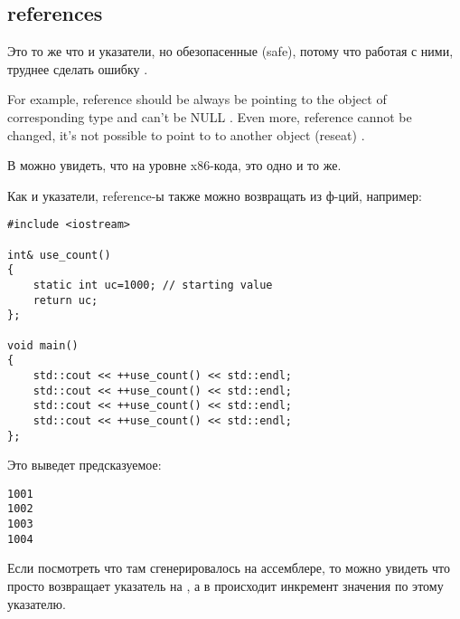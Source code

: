 ﻿\subsection{references}

Это то же что и указатели, но обезопасенные (safe), потому что работая с ними, труднее сделать ошибку
\cite[8.3.2]{CPP11}.

{For example, reference should be always be pointing to the object of corresponding type and can't be NULL}
\cite[8.6]{ParashiftCPPFAQ}.
{Even more, reference cannot be changed, it's not possible to point to to another object (reseat)}
\cite[8.5]{ParashiftCPPFAQ}.

В \cite[1.7.1]{REBook} можно увидеть, что на уровне x86-кода, это одно и то же.

Как и указатели, reference-ы также можно возвращать из ф-ций, например:

\begin{lstlisting}
#include <iostream>
 
int& use_count()
{
	static int uc=1000; // starting value
	return uc;
};
 
void main()
{
	std::cout << ++use_count() << std::endl;
	std::cout << ++use_count() << std::endl;
	std::cout << ++use_count() << std::endl;
	std::cout << ++use_count() << std::endl;
};
\end{lstlisting}

Это выведет предсказуемое:

\begin{lstlisting}
1001
1002
1003
1004
\end{lstlisting}

Если посмотреть что там сгенерировалось на ассемблере, то можно увидеть что  просто возвращает
указатель на , а в  происходит инкремент значения по этому указателю.

